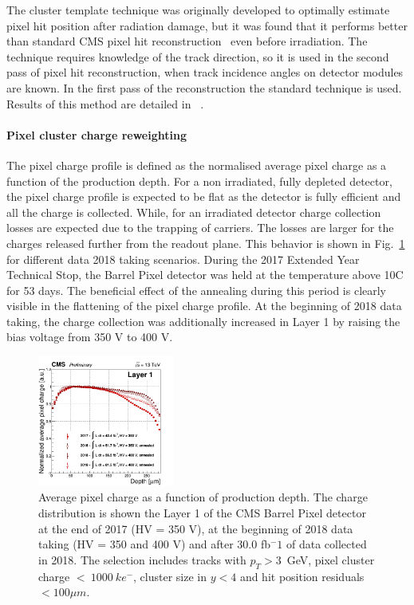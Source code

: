 The cluster template technique was originally developed to optimally estimate pixel hit position after radiation damage, but it was found that it performs better than standard CMS pixel hit reconstruction~\cite{standard} even before irradiation. 
The technique requires knowledge of the track direction, so it is used in the second pass of pixel hit reconstruction, when track incidence angles on detector modules are known. 
In the first pass of the reconstruction the standard technique is used.
Results of this method are detailed in ~\cite{pixelhit}.

\paragraph{Pixel cluster charge reweighting}
The pixel charge profile is defined as the normalised average pixel charge as a function of the production depth.
For a non irradiated, fully depleted detector, the pixel charge profile is expected to be flat as the detector is fully efficient and all the charge is collected. 
While, for an irradiated detector charge collection losses are expected due to the trapping of carriers. 
The losses are larger for the charges released further from the readout plane.
This behavior is shown in Fig.~\ref{fig:charge} for different data 2018 taking scenarios.
During the 2017 Extended Year Technical Stop, 
the Barrel Pixel detector was held at the temperature above 10\textdegree{}C for 53 days. 
The beneficial effect of the annealing during this period is clearly visible in the flattening of the pixel charge profile.
At the beginning of 2018 data taking, the charge collection was additionally increased in Layer 1 by raising the bias voltage from 350 V to 400 V.

\begin{figure}[htp]
\centering
\includegraphics[width=0.40\textwidth]{figures/SensorSimulation/norm55_v1.png}
\caption{ Average pixel charge as a function of production depth. 
The charge distribution is shown the Layer 1 of the CMS Barrel Pixel detector at the end of 2017 (HV = 350 V), at the beginning of 2018 data taking (HV = 350 and 400 V) and after 30.0 fb$^-1$ of data collected in 2018. 
The selection includes tracks with $p_T > 3$~GeV, pixel cluster charge $ <~1000~ke^{-}$, cluster size in $y < 4$ and hit position residuals $< 100 \mu m$.
}
\label{fig:charge}
\end{figure}

